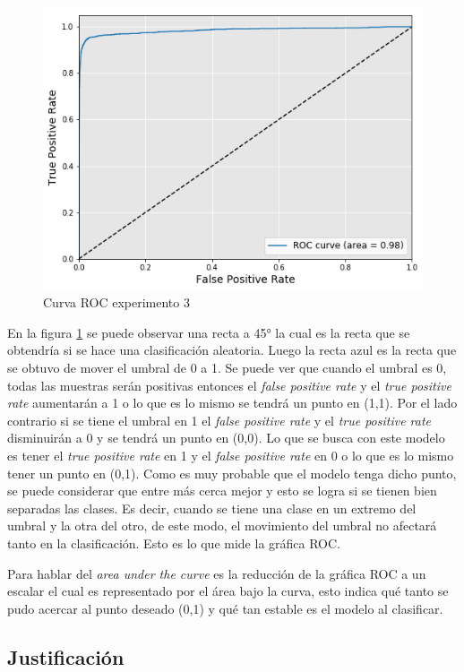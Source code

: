 \begin{figure}[H]
	\centering
	\includegraphics[width=0.8\linewidth]{imagenes/ROC_Exp3_1.png}
	\caption{Curva ROC experimento 3}
	\label{fig:ROCMuestra}
\end{figure}

\par En la figura \ref{fig:ROCMuestra} se puede observar una recta a \ang{45} la cual es la recta que se obtendría si se hace una clasificación aleatoria. Luego la recta azul es la recta que se obtuvo de mover el umbral de 0 a 1. Se puede ver que cuando el umbral es 0, todas las muestras serán positivas entonces el \textit{false positive rate} y el  \textit{true positive rate} aumentarán a 1 o lo que es lo mismo se tendrá un punto en (1,1). Por el lado contrario si se tiene el umbral en 1 el \textit{false positive rate} y el  \textit{true positive rate} disminuirán a 0 y se tendrá un punto en (0,0). Lo que se busca con este modelo es tener el \textit{true positive rate} en 1 y el \textit{false positive rate} en 0 o lo que es lo mismo tener un punto en (0,1). Como es muy probable que el modelo tenga dicho punto, se puede considerar que entre más cerca mejor y esto se logra si se tienen bien separadas las clases. Es decir, cuando se tiene una clase en un extremo del umbral y la otra del otro, de este modo, el movimiento del umbral no afectará tanto en la clasificación. Esto es lo que mide la gráfica ROC.

\par Para hablar del \textit{area under the curve} es la reducción de la gráfica ROC a un escalar el cual es representado por el área bajo la curva, esto indica qué tanto se pudo acercar al punto deseado (0,1) y qué tan estable es el modelo al clasificar.

\subsection{Justificación}

